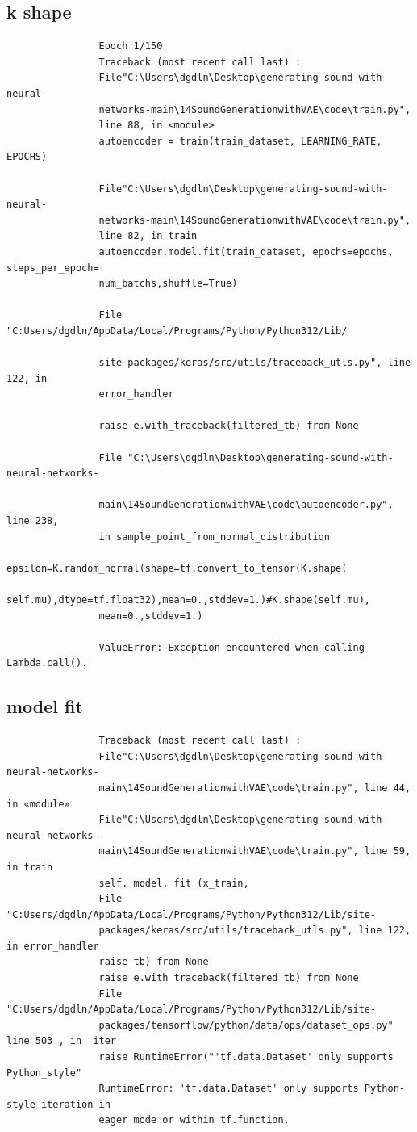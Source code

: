 \documentclass[12pt, a4paper]{article}
\begin{document}
			\subsection{k shape}
			\begin{verbatim}
				Epoch 1/150
				Traceback (most recent call last) :
				File"C:\Users\dgdln\Desktop\generating-sound-with-neural-
				networks-main\14SoundGenerationwithVAE\code\train.py", 
				line 88, in <module>
				autoencoder = train(train_dataset, LEARNING_RATE, EPOCHS)
				
				File"C:\Users\dgdln\Desktop\generating-sound-with-neural-
				networks-main\14SoundGenerationwithVAE\code\train.py", 
				line 82, in train
				autoencoder.model.fit(train_dataset, epochs=epochs, steps_per_epoch=
				num_batchs,shuffle=True)
				
				File "C:Users/dgdln/AppData/Local/Programs/Python/Python312/Lib/
				
				site-packages/keras/src/utils/traceback_utls.py", line 122, in 
				error_handler 
				
				raise e.with_traceback(filtered_tb) from None
				
				File "C:\Users\dgdln\Desktop\generating-sound-with-neural-networks-
				
				main\14SoundGenerationwithVAE\code\autoencoder.py", line 238,
				in sample_point_from_normal_distribution
				epsilon=K.random_normal(shape=tf.convert_to_tensor(K.shape(
				self.mu),dtype=tf.float32),mean=0.,stddev=1.)#K.shape(self.mu),
				mean=0.,stddev=1.)
				
				ValueError: Exception encountered when calling Lambda.call().
			\end{verbatim}
			
			\subsection{model fit}
			\begin{verbatim}
				Traceback (most recent call last) :
				File"C:\Users\dgdln\Desktop\generating-sound-with-neural-networks-
				main\14SoundGenerationwithVAE\code\train.py", line 44, in «module»
				File"C:\Users\dgdln\Desktop\generating-sound-with-neural-networks-
				main\14SoundGenerationwithVAE\code\train.py", line 59, in train
				self. model. fit (x_train,
				File 	"C:Users/dgdln/AppData/Local/Programs/Python/Python312/Lib/site-
				packages/keras/src/utils/traceback_utls.py", line 122, in error_handler
				raise tb) from None
				raise e.with_traceback(filtered_tb) from None
				File 	"C:Users/dgdln/AppData/Local/Programs/Python/Python312/Lib/site-
				packages/tensorflow/python/data/ops/dataset_ops.py" line 503 , in__iter__
				raise RuntimeError("'tf.data.Dataset' only supports Python_style"
				RuntimeError: 'tf.data.Dataset' only supports Python-style iteration in
				eager mode or within tf.function.
			\end{verbatim}
			
\end{document}
